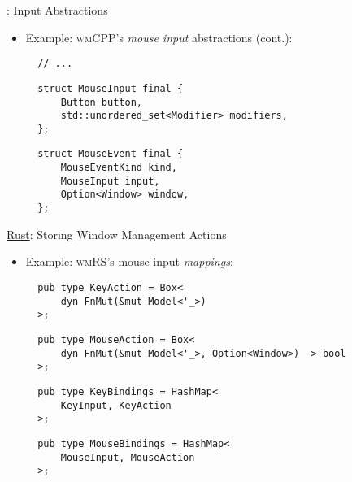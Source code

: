 \begin{frame}[fragile]{\underline{\cpp}: Input Abstractions \hfill {\footnotesize \currentname}}


    \begin{itemize}

        \item Example: \textsc{wmCPP}'s \textit{mouse input} abstractions (cont.):\\[3pt]
\begin{verbatim}
  // ...
\end{verbatim}
\begin{verbatim}
  struct MouseInput final {
      Button button,
      std::unordered_set<Modifier> modifiers,
  };
\end{verbatim}
\begin{verbatim}
  struct MouseEvent final {
      MouseEventKind kind,
      MouseInput input,
      Option<Window> window,
  };
\end{verbatim}

    \end{itemize}

    \vfill

\end{frame}

\begin{frame}[fragile]{\underline{Rust}: Storing Window Management Actions \hfill {\footnotesize \currentname}}


    \begin{itemize}

        \item Example: \textsc{wmRS}'s mouse input \textit{mappings}:\\[3pt]
\begin{verbatim}
  pub type KeyAction = Box<
      dyn FnMut(&mut Model<'_>)
  >;
\end{verbatim}
\begin{verbatim}
  pub type MouseAction = Box<
      dyn FnMut(&mut Model<'_>, Option<Window>) -> bool
  >;
\end{verbatim}
\begin{verbatim}
  pub type KeyBindings = HashMap<
      KeyInput, KeyAction
  >;
\end{verbatim}
\begin{verbatim}
  pub type MouseBindings = HashMap<
      MouseInput, MouseAction
  >;
\end{verbatim}

    \end{itemize}

    \vfill

\end{frame}

